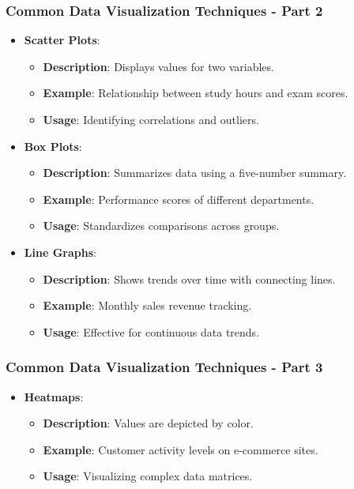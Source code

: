 \documentclass[aspectratio=169]{beamer}
\begin{document}
\begin{frame}[fragile]
    \frametitle{Common Data Visualization Techniques - Part 2}
    \begin{itemize}
        \item \textbf{Scatter Plots}:
        \begin{itemize}
            \item \textbf{Description}: Displays values for two variables.
            \item \textbf{Example}: Relationship between study hours and exam scores.
            \item \textbf{Usage}: Identifying correlations and outliers.
        \end{itemize}
        
        \item \textbf{Box Plots}:
        \begin{itemize}
            \item \textbf{Description}: Summarizes data using a five-number summary.
            \item \textbf{Example}: Performance scores of different departments.
            \item \textbf{Usage}: Standardizes comparisons across groups.
        \end{itemize}
        
        \item \textbf{Line Graphs}:
        \begin{itemize}
            \item \textbf{Description}: Shows trends over time with connecting lines.
            \item \textbf{Example}: Monthly sales revenue tracking.
            \item \textbf{Usage}: Effective for continuous data trends.
        \end{itemize}
    \end{itemize}
\end{frame}

\begin{frame}[fragile]
    \frametitle{Common Data Visualization Techniques - Part 3}
    \begin{itemize}
        \item \textbf{Heatmaps}:
        \begin{itemize}
            \item \textbf{Description}: Values are depicted by color.
            \item \textbf{Example}: Customer activity levels on e-commerce sites.
            \item \textbf{Usage}: Visualizing complex data matrices.
        \end{itemize}
    \end{itemize}
\end{frame}
\end{document}
